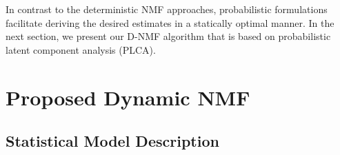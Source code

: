 \documentclass[10pt,twocolumn,twoside] {IEEEtran}
\begin{document}
In contrast to the deterministic NMF approaches, probabilistic formulations
facilitate deriving the desired estimates in a statically optimal
manner. In the next section, we present our D-NMF algorithm that is
based on probabilistic latent component analysis (PLCA)\cite{Smaragdis2006}.
\section{Proposed Dynamic NMF\label{sec:Proposed-Dynamic-NMF}}

\subsection{Statistical Model Description\label{sub:Statistical-Model-Description}}
\end{document}
